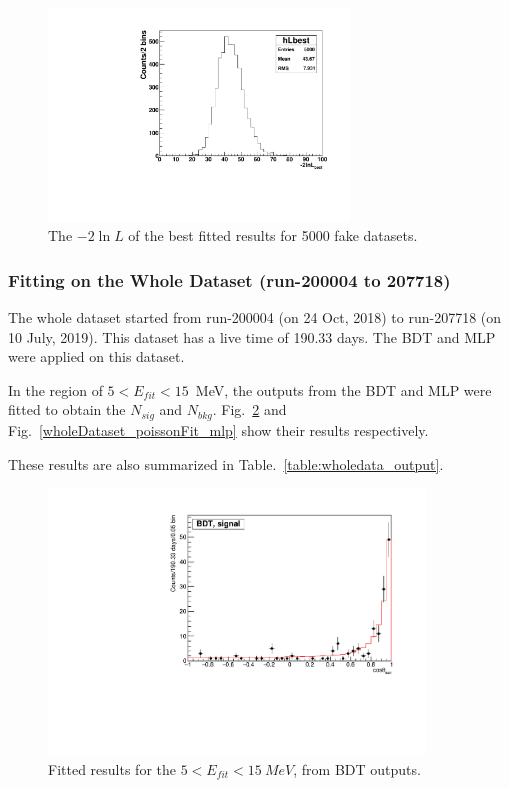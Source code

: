 \begin{figure}[!htb]
	\centering
	\includegraphics[width=8cm]{ensemble_lnLbest.pdf}
	\caption{The $-2\ln L$ of the best fitted results for 5000 fake datasets.}
	\label{poisson_fitLnL}
\end{figure}

\subsubsection{Fitting on the Whole Dataset (run-200004 to 207718)}
The whole dataset started from run-200004 (on 24 Oct, 2018) to run-207718 (on 10 July, 2019). This dataset has a live time of 190.33 days. The BDT and MLP were applied on this dataset.

In the region of $5<E_{fit}<15$~MeV, the outputs from the BDT and MLP were fitted to obtain the $N_{sig}$ and $N_{bkg}$. Fig.~\ref{wholeDataset_poissonFit_bdt} and Fig.~\ref{wholeDataset_poissonFit_mlp} show their results respectively.

These results are also summarized in Table.~\ref{table:wholedata_output}.

\begin{figure}[!htb]
	\centering
	\includegraphics[width=10cm]{wholedataFit_bdt.pdf}
	\caption{Fitted results for the $5<E_{fit}<15~MeV$, from BDT outputs.} \label{wholeDataset_poissonFit_bdt}
\end{figure} 


